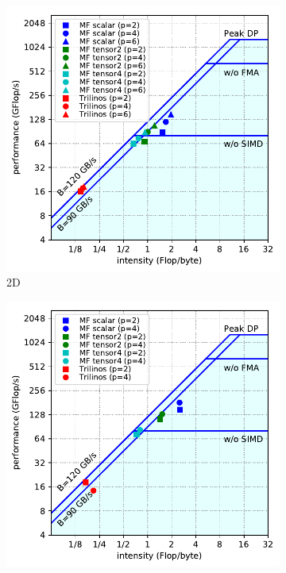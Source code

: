 \documentclass[AMA,STIX1COL]{WileyNJD-v2}
\begin{document}
\begin{figure}[!ht]
  \centering
  \begin{subfigure}[b]{0.49\textwidth}
    \centering
    \includegraphics[width=\textwidth]{LIKWID_CSL_Munich_roofline_2d.pdf}
    \caption{2D}
    \label{fig:roofline_2d}
  \end{subfigure}
  \begin{subfigure}[b]{0.49\textwidth}
    \centering
    \includegraphics[width=\textwidth]{LIKWID_CSL_Munich_roofline_3d.pdf}

\end{subfigure}
\end{figure}
\end{document}

